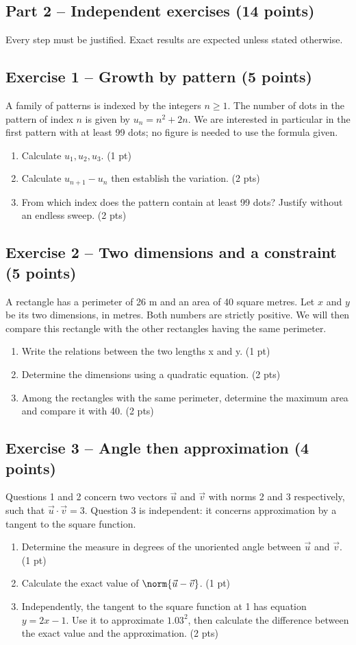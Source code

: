 \mxnewpage\subsection*{Part 2 -- Independent exercises (14 points)}
Every step must be justified. Exact results are expected unless stated otherwise.
\subsection*{Exercise 1 -- Growth by pattern (5 points)}
A family of patterns is indexed by the integers $n\geq1$. The number of dots in the pattern of index $n$ is given by $u_n=n^2+2n$. We are interested in particular in the first pattern with at least 99 dots; no figure is needed to use the formula given.
\begin{enumerate}
\item Calculate $u_1,u_2,u_3$. \hfill(1 pt)
\item Calculate $u_{n+1}-u_n$ then establish the variation. \hfill(2 pts)
\item From which index does the pattern contain at least 99 dots? Justify without an endless sweep. \hfill(2 pts)
\end{enumerate}
\subsection*{Exercise 2 -- Two dimensions and a constraint (5 points)}
A rectangle has a perimeter of 26 m and an area of 40 square metres. Let $x$ and $y$ be its two dimensions, in metres. Both numbers are strictly positive. We will then compare this rectangle with the other rectangles having the same perimeter.
\begin{enumerate}
\item Write the relations between the two lengths x and y. \hfill(1 pt)
\item Determine the dimensions using a quadratic equation. \hfill(2 pts)
\item Among the rectangles with the same perimeter, determine the maximum area and compare it with 40. \hfill(2 pts)
\end{enumerate}
\subsection*{Exercise 3 -- Angle then approximation (4 points)}
Questions 1 and 2 concern two vectors $\vec u$ and $\vec v$ with norms 2 and 3 respectively, such that $\vec u\cdot\vec v=3$. Question 3 is independent: it concerns approximation by a tangent to the square function.
\begin{enumerate}
\item Determine the measure in degrees of the unoriented angle between $\vec u$ and $\vec v$. \hfill(1 pt)
\item Calculate the exact value of $\norm{\vec u-\vec v}$. \hfill(1 pt)
\item Independently, the tangent to the square function at 1 has equation $y=2x-1$. Use it to approximate $\num{1,03}^2$, then calculate the difference between the exact value and the approximation. \hfill(2 pts)
\end{enumerate}
